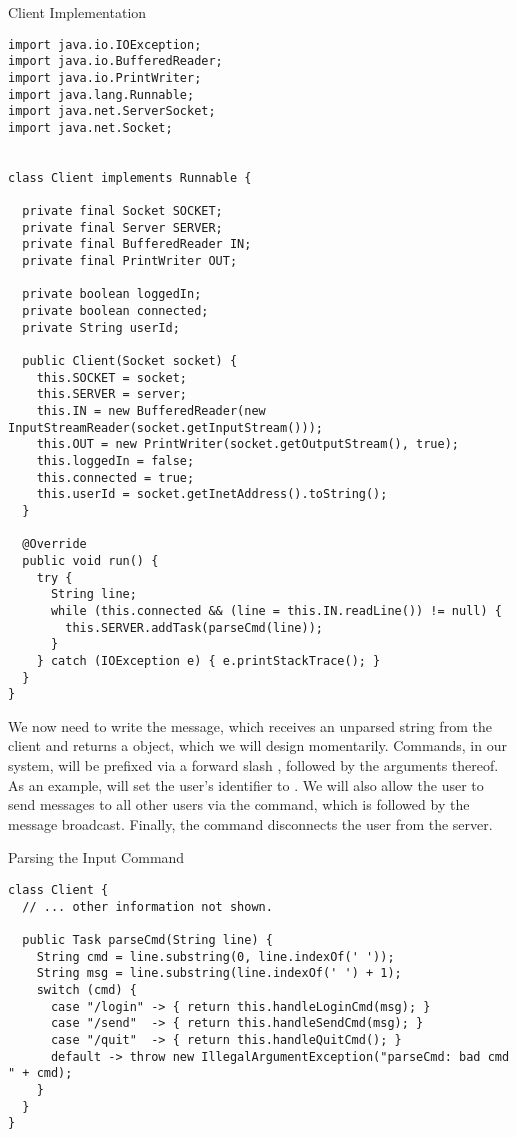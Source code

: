 \begin{cl}[]{Client Implementation}
\begin{lstlisting}[language=MyJava]
import java.io.IOException;
import java.io.BufferedReader;
import java.io.PrintWriter;
import java.lang.Runnable;
import java.net.ServerSocket;
import java.net.Socket;


class Client implements Runnable {

  private final Socket SOCKET;
  private final Server SERVER;
  private final BufferedReader IN;
  private final PrintWriter OUT;

  private boolean loggedIn;
  private boolean connected;
  private String userId;

  public Client(Socket socket) {
    this.SOCKET = socket;
    this.SERVER = server;
    this.IN = new BufferedReader(new InputStreamReader(socket.getInputStream()));
    this.OUT = new PrintWriter(socket.getOutputStream(), true);
    this.loggedIn = false;
    this.connected = true;
    this.userId = socket.getInetAddress().toString();
  }

  @Override
  public void run() {
    try {
      String line;
      while (this.connected && (line = this.IN.readLine()) != null) { 
        this.SERVER.addTask(parseCmd(line)); 
      }
    } catch (IOException e) { e.printStackTrace(); }
  }
}
\end{lstlisting}
\end{cl}

We now need to write the  message, which receives an unparsed string from the client and returns a  object, which we will design momentarily. Commands, in our system, will be prefixed via a forward slash \ttt{/}, followed by the arguments thereof. As an example,  will set the user's identifier to . We will also allow the user to send messages to all other users via the  command, which is followed by the message broadcast. Finally, the  command disconnects the user from the server.

\begin{cl}[]{Parsing the Input Command}
\begin{lstlisting}[language=MyJava]
class Client {
  // ... other information not shown.

  public Task parseCmd(String line) {
    String cmd = line.substring(0, line.indexOf(' '));
    String msg = line.substring(line.indexOf(' ') + 1);
    switch (cmd) {
      case "/login" -> { return this.handleLoginCmd(msg); }
      case "/send"  -> { return this.handleSendCmd(msg); }
      case "/quit"  -> { return this.handleQuitCmd(); }
      default -> throw new IllegalArgumentException("parseCmd: bad cmd " + cmd);
    }
  }
}
\end{lstlisting}
\end{cl}

